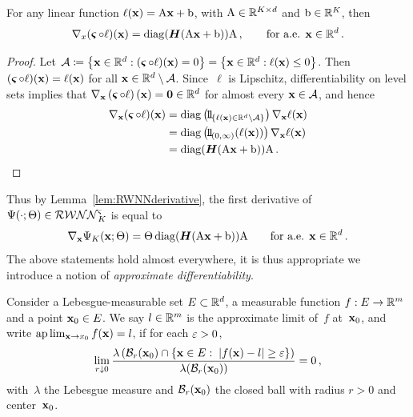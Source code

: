 \begin{lemma}\label{lem:RWNNderivative}
For any linear function $\ell(\mathbf{x})=\mathrm{A} \mathbf{x} + \mathrm{b}$, with $\mathrm{A}\in\mathbb{R}^{K\times d}$ and $\mathrm{b}\in\mathbb{R}^K$, then
\[
\nabla_x(\operatorname{\boldsymbol\varsigma}\circ \ell)(\mathbf{x}) = \operatorname{diag}(\boldsymbol{H}(\mathrm{A} \mathbf{x}+\mathrm{b}))\mathrm{A}\,,
\qquad \text{for a.e. } \mathbf{x}\in\mathbb{R}^d\,.
\]
\end{lemma}
\begin{proof}
Let $\mathcal{A}\coloneqq\left\{\mathbf{x}\in\mathbb{R}^d: (\operatorname{\boldsymbol\varsigma}\circ\ell)(\mathbf{x})=0\right\}
=\left\{\mathbf{x}\in\mathbb{R}^d:\ell(\mathbf{x})\leq 0\right\}$. 
Then ${(\operatorname{\boldsymbol\varsigma}\circ\ell)(\mathbf{x})=\ell(\mathbf{x})}$ for all $\mathbf{x}\in\mathbb{R}^d\setminus\mathcal{A}$.
Since~$\ell$ is Lipschitz,
differentiability on level sets \cite[Section~3.1.2,~Corollary~I]{Evans1992MeasureFunctions} implies that
$\nabla_{\mathbf{x}}\left(\operatorname{\boldsymbol\varsigma}\circ\ell\right)(\mathbf{x}) = \boldsymbol{0}\in\mathbb{R}^d$
for almost every $\mathbf{x}\in\mathcal{A}$,
and hence
\begin{align*}
\nabla_{\xxbf}(\brelu\circ\ell)(\xxbf)
&=\operatorname{diag}\left(\ind_{\{\ell(\xxbf)\in\RR^d\setminus\Aa\}}\right)\nabla_{\xxbf}\ell(\xxbf) \\
&=\operatorname{diag}\left(\ind_{(0,\infty)}(\ell(\xxbf))\right)\nabla_{\xxbf}\ell(\xxbf) \\
&=\operatorname{diag}(\Hb(\Am \xxbf+\bm))\Am\,.
\end{align*}
\end{proof}
Thus by Lemma~\ref{lem:RWNNderivative}, the first derivative of $\Psi(\cdot;\Theta)\in\mathcal{RWNN}^{\varsigma}_K$ is equal to 
\begin{equation}\label{eq:RWNN1stderivative}
    \nabla_{\mathbf{x}}\Psi_K(\mathbf{x}; \Theta)
    = \Theta\operatorname{diag}(\boldsymbol{H}(\mathrm{A} \mathbf{x}+\mathrm{b}))\mathrm{A}
    \qquad \text{for a.e. } \mathbf{x}\in\mathbb{R}^d\,.
\end{equation}
The above statements hold almost everywhere, it is thus appropriate we introduce a notion of \textit{approximate differentiability}.
\begin{definition}
Consider a Lebesgue-measurable set $E \subset \mathbb{R}^d$, a measurable function $f: E \rightarrow \mathbb{R}^m$ and a point $\boldsymbol{\mathrm{x}}_0 \in E$. We say $l \in \mathbb{R}^m$ is the approximate limit of~$f$ at~$\boldsymbol{\mathrm{x}}_0$, and write
$\mathrm{ap}\lim_{\mathbf{x} \rightarrow x_0} f(\mathbf{x})=l$,
if for each $\varepsilon>0$,
\[
\lim _{r \downarrow 0} \frac{\lambda\left(\mathcal{B}_r(\boldsymbol{\mathrm{x}}_0) \cap\left\{\mathbf{x}\in E:\;|f(\mathbf{x})-l| \geq \varepsilon\right\}\right)}{\lambda(\mathcal{B}_r(\boldsymbol{\mathrm{x}}_0))}=0\,,
\]
with~$\lambda$ the Lebesgue measure and $\mathcal{B}_r(\boldsymbol{\mathrm{x}}_0)$ the closed ball with radius $r>0$ and center~$\boldsymbol{\mathrm{x}}_0$.
\end{definition}
